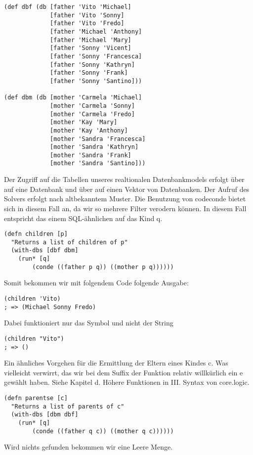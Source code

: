\begin{lstlisting}
(def dbf (db [father 'Vito 'Michael]
             [father 'Vito 'Sonny]
             [father 'Vito 'Fredo]
             [father 'Michael 'Anthony]
             [father 'Michael 'Mary]
             [father 'Sonny 'Vicent]
             [father 'Sonny 'Francesca]
             [father 'Sonny 'Kathryn]
             [father 'Sonny 'Frank]
             [father 'Sonny 'Santino]))
 
(def dbm (db [mother 'Carmela 'Michael]
             [mother 'Carmela 'Sonny]
             [mother 'Carmela 'Fredo]
             [mother 'Kay 'Mary]
             [mother 'Kay 'Anthony]
             [mother 'Sandra 'Francesca]
             [mother 'Sandra 'Kathryn]
             [mother 'Sandra 'Frank]
             [mother 'Sandra 'Santino]))
\end{lstlisting}
Der Zugriff auf die Tabellen unseres realtionalen Datenbankmodels erfolgt über  auf eine Datenbank und über  auf einen Vektor von Datenbanken. Der Aufruf des Solvers erfolgt nach altbekanntem Muster. Die Benutzung von code{conde} bietet sich in diesem Fall an, da wir so mehrere Filter verodern können. In diesem Fall entspricht das einem SQL-ähnlichen  auf das Kind q.

\begin{lstlisting}
(defn children [p] 
  "Returns a list of children of p"
  (with-dbs [dbf dbm] 
	(run* [q] 
		(conde ((father p q)) ((mother p q))))))
\end{lstlisting}
Somit bekommen wir mit folgendem Code folgende Ausgabe:

\begin{lstlisting}
(children 'Vito)
; => (Michael Sonny Fredo)
\end{lstlisting}
Dabei funktioniert nur das Symbol  und nicht der String 

\begin{lstlisting}
(children "Vito")
; => ()
\end{lstlisting}

Ein ähnliches Vorgehen für die Ermittlung der Eltern eines Kindes \dq{}c\dq{}. Was vielleicht verwirrt, das wir bei dem Suffix der Funktion relativ willkürlich ein e gewählt haben. Siehe Kapitel d. Höhere Funktionen in III. Syntax von core.logic.

\begin{lstlisting}
(defn parentse [c] 
  "Returns a list of parents of c"
  (with-dbs [dbm dbf] 
	(run* [q] 
		(conde ((father q c)) ((mother q c))))))
\end{lstlisting}
Wird nichts gefunden bekommen wir eine Leere Menge.

